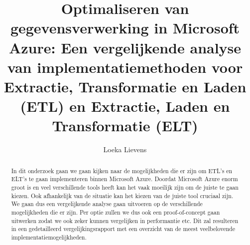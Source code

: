 \documentclass{hogent-article}
\title{Optimaliseren van gegevensverwerking in Microsoft Azure: Een vergelijkende analyse van implementatiemethoden voor Extractie, Transformatie en Laden (ETL) en Extractie, Laden en Transformatie (ELT)}
\author{Loeka Lievens}
\begin{document}
\begin{abstract}
  In dit onderzoek gaan we gaan kijken naar de mogelijkheden die er zijn om ETL's en ELT's te gaan implementeren binnen Microsoft Azure. Doordat Microsoft Azure enorm groot is en veel verschillende tools heeft kan het vaak moeilijk zijn om de juiste te gaan kiezen. Ook afhankelijk van de situatie kan het kiezen van de juiste tool cruciaal zijn. We gaan dus een vergelijkende analyse gaan uitvoeren op de verschillende mogelijkheden die er zijn. Per optie zullen we dus ook een proof-of-concept gaan uitwerken zodat we ook zeker kunnen vergelijken in performantie etc. Dit zal resulteren in een gedetailleerd vergelijkingsrapport met een overzicht van de meest veelbelovende implementatiemogelijkheden.
\end{abstract}

\tableofcontents



\printbibliography[heading=bibintoc]
\end{document}
